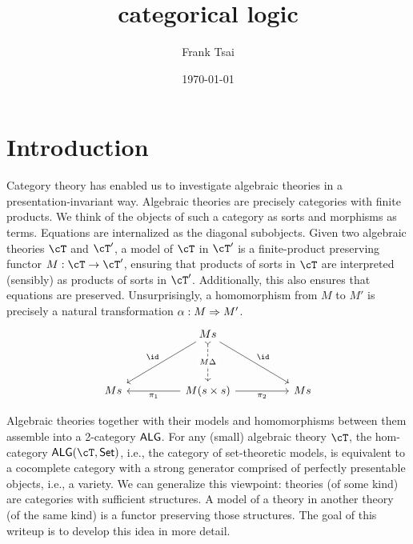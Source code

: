 \documentclass[article,10pt,oneside]{memoir}
\title{categorical logic}
\author{Frank Tsai}
\date{\today}
\begin{document}
\maketitle
\tableofcontents

\section{Introduction}
\label{sec:introduction}

Category theory has enabled us to investigate algebraic theories in a presentation-invariant way.
Algebraic theories are precisely categories with finite products.
We think of the objects of such a category as sorts and morphisms as terms.
Equations are internalized as the diagonal subobjects.
Given two algebraic theories $\cT$ and $\cT'$, a model of $\cT$ in $\cT'$ is a finite-product preserving functor $M : \cT \to \cT'$, ensuring that products of sorts in $\cT$ are interpreted (sensibly) as products of sorts in $\cT'$.
Additionally, this also ensures that equations are preserved.
Unsurprisingly, a homomorphism from $M$ to $M'$ is precisely a natural transformation $\alpha : M \Rightarrow M'$.
\[\begin{tikzcd}
    && Ms \\
    \\
    Ms && {M(s \times s)} && {Ms}
    \arrow["{\pi_{1}}", from=3-3, to=3-1]
    \arrow["{\pi_{2}}"', from=3-3, to=3-5]
    \arrow["\id"', from=1-3, to=3-1]
    \arrow["\id", from=1-3, to=3-5]
    \arrow["M\Delta"{description}, dashed, tail, from=1-3, to=3-3]
  \end{tikzcd}\]

Algebraic theories together with their models and homomorphisms between them assemble into a 2-category $\mathsf{ALG}$.
For any (small) algebraic theory $\cT$, the hom-category $\CAlg(\cT,\CSet)$, i.e., the category of set-theoretic models, is equivalent to a cocomplete category with a strong generator comprised of perfectly presentable objects, i.e., a variety.
We can generalize this viewpoint: theories (of some kind) are categories with sufficient structures.
A model of a theory in another theory (of the same kind) is a functor preserving those structures.
The goal of this writeup is to develop this idea in more detail.
\end{document}
